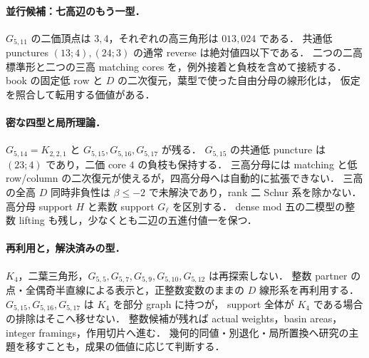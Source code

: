 \paragraph{並行候補：七高辺のもう一型．}
$G_{5,11}$ の二価頂点は $3,4$，それぞれの高三角形は $013,024$ である．
共通低 punctures $(13;4),(24;3)$ の通常 reverse は絶対値四以下である．
二つの二高標準形と二つの三高 matching cores を，例外接着と負枝を含めて接続する．
book の固定低 row と $D$ の二次復元，葉型で使った自由分母の線形化は，
仮定を照合して転用する価値がある．

\paragraph{密な四型と局所理論．}
$G_{5,14}=K_{2,2,1}$ と $G_{5,15},G_{5,16},G_{5,17}$ が残る．
$G_{5,15}$ の共通低 puncture は $(23;4)$ であり，二価 core $4$ の負枝も保持する．
三高分母には matching と低 row/column の二次復元が使えるが，四高分母へは自動的に拡張できない．
三高の全高 $D$ 同時非負性は $\beta\le-2$ で未解決であり，rank 二 Schur 系を除かない．
高分母 support $H$ と素数 support $G_\ell$ を区別する．
dense mod 五の二模型の整数 lifting も残し，少なくとも二辺の五進付値一を保つ．

\paragraph{再利用と，解決済みの型．}
$K_4$，二葉三角形，$G_{5,5},G_{5,7},G_{5,9},G_{5,10},G_{5,12}$ は再探索しない．
整数 partner の点・全偶奇半直線による表示と，正整数変数のままの $D$ 線形系を再利用する．
$G_{5,15},G_{5,16},G_{5,17}$ は $K_4$ を部分 graph に持つが，
support 全体が $K_4$ である場合の排除はそこへ移せない．
整数候補が残れば actual weights，basin areas，integer framings，作用切片へ進む．
幾何的同値・別退化・局所置換へ研究の主題を移すことも，成果の価値に応じて判断する．
